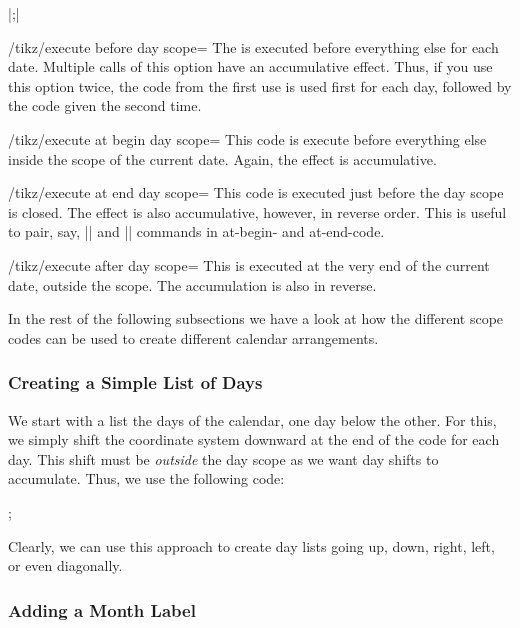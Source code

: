 \begin{command}{\calendar {}|;|}
  \begin{key}{/tikz/execute before day scope=}
    The  is executed before everything else for each
    date. Multiple
    calls of this option have an accumulative effect. Thus, if you use
    this option twice, the code from the first use is used first for
    each day, followed by the code given the second time.
  \end{key}
  \begin{key}{/tikz/execute at begin day scope=}
    This code is execute before everything else inside the scope of
    the current date. Again, the effect is accumulative.
  \end{key}
  \begin{key}{/tikz/execute at end day scope=}
    This code is executed just before the day scope is
    closed. The effect is also accumulative, however, in reverse
    order. This is useful to pair, say, |\scope| and |\endscope|
    commands in at-begin- and at-end-code.
  \end{key}
  \begin{key}{/tikz/execute after day scope=}
    This is executed at the very end of the current date, outside the
    scope. The accumulation is also in reverse.
  \end{key}
\end{command}


In the rest of the following subsections we have a look at how the
different scope codes can be used to create different calendar
arrangements.


\subsubsection{Creating a Simple List of Days}

We start with a list the days of the calendar, one day below the
other. For this, we simply shift the coordinate system downward at the
end of the code for each day. This shift must be \emph{outside} the
day scope as we want day shifts to accumulate. Thus, we use the
following code:
\begin{codeexample}[]
\tikz
  \calendar [dates=2000-01-01 to 2000-01-08,
             execute after day scope=
               {\pgftransformyshift{-1em}}];
\end{codeexample}
Clearly, we can use this approach to create day lists going up,
down, right, left, or even diagonally.


\subsubsection{Adding a Month Label}

